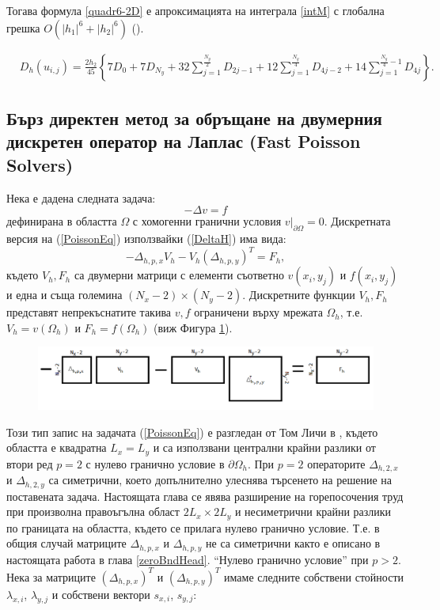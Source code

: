 \documentclass[a4paper]{article}
\newcommand{\be}{\begin{equation}}
\newcommand{\ee}{\end{equation}}
\newcommand{\rf}[1]{(\ref{#1})}
\theoremstyle{remark}
\begin{document}
Тогава формула \eqref{quadr6-2D} е апроксимацията на интеграла \eqref{intM} с глобална грешка $O(|h_1|^6+|h_2|^6)$ (\cite{boole}).

\begin{align}\label{quadr6-2D}
&D_h(u_{i,j})  =
\frac{2h_2}{45} 
\left\{
7D_{0}+7D_{N_y}+32 \sum_{j=1}^{\frac{N_y}{2}}D_{2j-1}
+12\sum_{j=1}^{\frac{N_y}{4}}D_{4j-2}
+14 \sum_{j=1}^{\frac{N_y}{4}-1}D_{4j}
\right\}.
\end{align}

\subsection{Бърз директен метод за обръщане на двумерния дискретен оператор на Лаплас (Fast Poisson Solvers) }\label{FPS}
Нека е дадена следната задача:
\be\label{PoissonEq}
-\Delta v = f
\ee
дефинирана в областта $\Omega$ с хомогенни гранични условия $v \big|_{\partial\Omega} = 0$. Дискретната версия на \rf{PoissonEq} използвайки \rf{DeltaH} има вида:
\be\label{PsnDiscret}
-\Delta_{h,p,x}  V_h - V_h (\Delta_{h,p,y})^T = F_h,
\ee
където $V_h, F_h$ са двумерни матрици с елементи съответно $v(x_i,y_j)$ и  $f(x_i,y_j)$ и една и съща големина $(N_x-2)\times(N_y-2)$. Дискретните функции $V_h, F_h$ представят непрекъснатите такива $v, f$ ограничени върху мрежата $\Omega_h$, т.е. $V_h = v(\Omega_h)$ и $F_h = f(\Omega_h)$ (виж Фигура \ref{fig:FPSexplained}).
\begin{figure}[ht]
     \includegraphics[width=\linewidth]{FPSExplained.png}
	\caption{}
	\label{fig:FPSexplained}
\end{figure}
\FloatBarrier
Този тип запис на задачата \rf{PoissonEq} е разгледан от Том Личи в \cite{ref34}, където областта е квадратна $L_x = L_y$ и са използвани централни крайни разлики от втори ред $p=2$ с нулево гранично условие в $\partial \Omega_h$. При $p=2$ операторите $\Delta_{h,2,x}$ и $\Delta_{h,2,y}$ са симетрични, което допълнително улеснява търсенето на решение на поставената задача. Настоящата глава се явява разширение на горепосочения труд при произволна правоъгълна област $2L_x \times 2L_y$ и несиметрични крайни разлики по границата на областта, където се прилага нулево гранично условие. Т.е. в общия случай матриците $\Delta_{h,p,x}$ и $\Delta_{h,p,y}$ не са симетрични както е описано в настоящата работа в глава \ref{zeroBndHead}. ``Нулево гранично условие'' при $p>2$. Нека за матриците $(\Delta_{h,p,x})^T$ и $(\Delta_{h,p,y})^T$ имаме следните собствени стойности $\lambda_{x,i}$, $\lambda_{y,j}$ и собствени вектори $s_{x,i}$, $s_{y,j}$:
\end{document}
